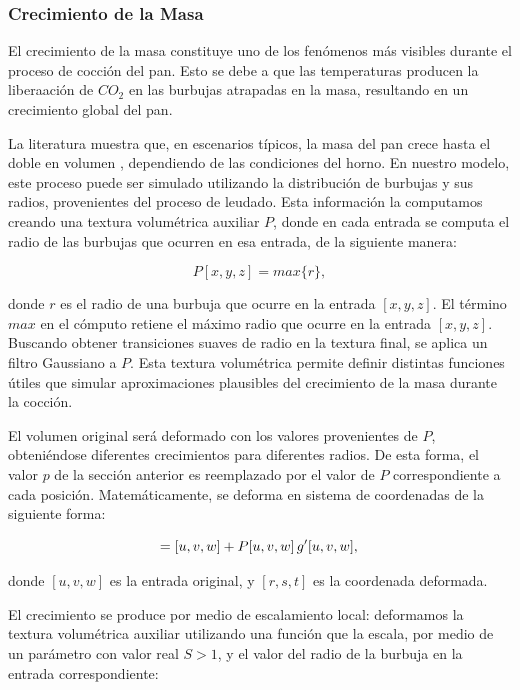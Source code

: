 \subsubsection{Crecimiento de la Masa}
El crecimiento de la masa constituye uno de los fenómenos más visibles durante el proceso de cocción del pan.
Esto se debe a que las temperaturas producen la liberaación de $CO_2$ en las burbujas atrapadas en la masa, resultando en un crecimiento global del pan.

La literatura muestra que, en escenarios típicos, la masa del pan crece hasta el doble en volumen \cite{Fan1999}, dependiendo de las condiciones del horno.
En nuestro modelo, este proceso puede ser simulado utilizando la distribución de burbujas y sus radios, provenientes del proceso de leudado.
Esta información la computamos creando una textura volumétrica auxiliar $P$, donde en cada entrada se computa el radio de las burbujas que ocurren en esa entrada, de la siguiente manera:

$$P[x,y,z] = max \bigg\{r\bigg\},$$

\noindent donde $r$ es el radio de una burbuja que ocurre en la entrada $[x,y,z]$.
El término $max$ en el cómputo retiene el máximo radio que ocurre en la entrada $[x,y,z]$.
Buscando obtener transiciones suaves de radio en la textura final, se aplica un filtro Gaussiano a $P$.
Esta textura volumétrica permite definir distintas funciones útiles que simular aproximaciones plausibles del crecimiento de la masa durante la cocción.

El volumen original será deformado con los valores provenientes de $P$, obteniéndose diferentes crecimientos para diferentes radios.
De esta forma, el valor $p$ de la sección anterior es reemplazado por el valor de $P$ correspondiente a cada posición.
Matemáticamente, se deforma en sistema de coordenadas de la siguiente forma:

\begin{equation*}
[r,s,t] = [u,v,w] + P[u,v,w] \, g'[u,v,w], \\
\end{equation*}

\noindent donde $[u,v,w]$ es la entrada original, y $[r,s,t]$ es la coordenada deformada.

El crecimiento se produce por medio de escalamiento local: deformamos la textura volumétrica auxiliar utilizando una función que la escala, por medio de un parámetro con valor real $S > 1$, y el valor del radio de la burbuja en la entrada correspondiente:

